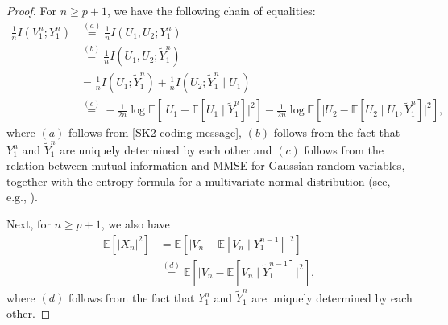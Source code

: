 \documentclass[12pt]{article}
\newcommand{\E}{\mathbb{E}}
\begin{document}
\begin{proof}
For $n\ge p+1$, we have the following chain of equalities:
\begin{equation}\label{mutual-info-sk2}
\begin{aligned}
\frac{1}{n}I(V_1^n;Y_1^n) &\overset{(a)}{=}\frac{1}{n}I(U_1,U_2;Y_1^n)\\
&\overset{(b)}{=}\frac{1}{n}I(U_1,U_2;\widetilde{Y}_1^n)      \\
&= \frac{1}{n}I(U_1;\widetilde{Y}_1^n) +\frac{1}{n}I(U_2;\widetilde{Y}_1^n\mid U_1)\\
&\overset{(c)}{=}-\frac{1}{2n}\log\E[\vert U_1-\E[U_1\mid \widetilde{Y}_{1}^n] \vert^2] -\frac{1}{2n}\log\E[\vert U_2-\E[U_2\mid U_1, \widetilde{Y}_{1}^n] \vert^2],
\end{aligned}
\end{equation}
where $(a)$ follows from \eqref{SK2-coding-message}, $(b)$ follows from the fact that $Y_1^n$ and $\widetilde{Y}_1^n$ are uniquely determined by each other and $(c)$ follows from the relation between mutual information and MMSE for Gaussian random variables, together with the entropy formula for a multivariate normal distribution (see, e.g., \cite[Theorem 8.6.6 \& its corollary]{cover1991elements}).

Next, for $n\ge p+1$, we also have
\begin{equation}\label{power-eqn-sk2}
   \begin{aligned}
      \E[|X_n|^2] &= \E[\vert V_n-\E[V_n\mid Y_1^{n-1}]\vert ^2]\\
      &\overset{(d)}{=}\E[\vert V_n - \E[ V_n\mid \widetilde{Y}_1^{n-1}]\vert^2],
   \end{aligned}
\end{equation}
where $(d)$ follows from the fact that $Y_1^n$ and $\widetilde{Y}_1^n$ are uniquely determined by each other.


\end{proof}
\end{document}
